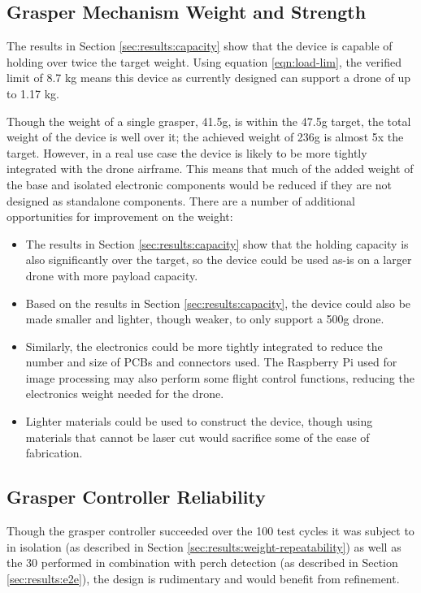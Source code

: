 \subsection{Grasper Mechanism Weight and Strength}

The results in Section \ref{sec:results:capacity} show that the device is capable of holding
over twice the target weight. Using equation \ref{eqn:load-lim}, the verified 
limit of 8.7 kg means this device as currently designed can support a drone of up to 1.17 kg.

Though the weight of a single grasper, 41.5g, is within the 47.5g target, the total weight of the device is well over it; the achieved weight of
236g is almost 5x the target. However, in a real use case the device is likely to be more tightly integrated with the drone airframe. 
This means that much of the added weight of the base and isolated electronic components would be reduced if they are not designed as
standalone components. There are a number of additional opportunities for improvement on the weight: 

\begin{itemize}
    \item The results in Section \ref{sec:results:capacity} show that the holding capacity 
        is also significantly over the target, so the device could be used as-is on a larger drone with 
        more payload capacity.
    \item Based on the results in Section \ref{sec:results:capacity}, the device could also be made
        smaller and lighter, though weaker, to only support a 500g drone.
    \item Similarly, the electronics could be more tightly integrated to reduce the number and size of
        PCBs and connectors used. The Raspberry Pi used for image processing may also perform some flight
        control functions, reducing the electronics weight needed for the drone.
    \item Lighter materials could be used to construct the device, though using materials that cannot be laser 
        cut would sacrifice some of the ease of fabrication.
\end{itemize}


\subsection{Grasper Controller Reliability}

Though the grasper controller succeeded over the 100 test cycles it was subject to in isolation
(as described in Section \ref{sec:results:weight-repeatability}) as well as the 30 performed in 
combination with perch detection (as described in Section \ref{sec:results:e2e}), the design is 
rudimentary and would benefit from refinement. 

